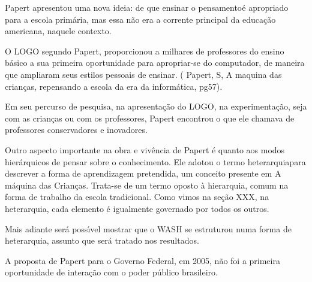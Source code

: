 \documentclass[
12pt,		%
openright,	%
twoside,  %
a4paper,			%
chapter=TITLE,		%
english,			%
french,				%
spanish,			%
brazil				%
]{USPSC-classe/USPSC}
\begin{document}
Papert apresentou uma nova ideia: de que \textquotedbl ensinar o pensamento\textquotedbl   \'e apropriado para a escola prim\'aria, mas essa n\~ao era a corrente principal da educa\c{c}\~ao americana, naquele contexto.










O LOGO segundo Papert,  proporcionou a milhares de professores do ensino b\'asico a sua primeira oportunidade para apropriar-se do computador, de maneira que ampliaram seus estilos pessoais de ensinar. ( Papert, S, \textquotedbl A maquina das crian\c{c}as, repensando a escola da era da inform\'atica\textquotedbl  , pg57).










Em seu percurso de pesquisa, na apresenta\c{c}\~ao do LOGO, na experimenta\c{c}\~ao, seja com as crian\c{c}as ou com os professores, Papert encontrou o que ele chamava de \textquotedbl professores conservadores e  inovadores\textquotedbl  [XXX].










Outro aspecto importante na obra e viv\^encia de Papert \'e quanto aos modos hier\'arquicos de pensar sobre o conhecimento.  Ele adotou o termo  \textquotedbl heterarquia\textquotedbl  para descrever a forma de aprendizagem pretendida, um conceito presente em  \textquotedbl A m\'aquina das Crian\c{c}as\textquotedbl . Trata-se de  um termo oposto \`a hierarquia, comum na forma de trabalho da escola tradicional. Como vimos na se\c{c}\~ao XXX, na heterarquia, cada elemento \'e igualmente governado por todos os outros.










Mais adiante ser\'a poss\'{\i}vel mostrar que o WASH se estruturou numa forma de heterarquia, assunto que ser\'a tratado nos resultados.










A proposta de Papert para o Governo Federal, em 2005, n\~ao foi a primeira oportunidade de intera\c{c}\~ao com o poder p\'ublico brasileiro.
\end{document}
